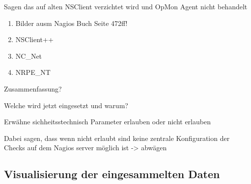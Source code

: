 Sagen das auf alten NSClient verzichtet wird und OpMon Agent nicht behandelt
\begin{enumerate}
\item Bilder ausm Nagios Buch Seite 472ff!
\item NSClient++
\item NC\_Net
\item NRPE\_NT
\end{enumerate}

Zusammenfassung?


Welche wird jetzt eingesetzt und warum?

Erwähne sichheitsstechnisch Parameter erlauben oder nicht erlauben

Dabei sagen, dass wenn nicht erlaubt sind keine zentrale Konfiguration der Checks auf dem Nagios server möglich ist -> abwägen

\subsection{Visualisierung der eingesammelten Daten}

